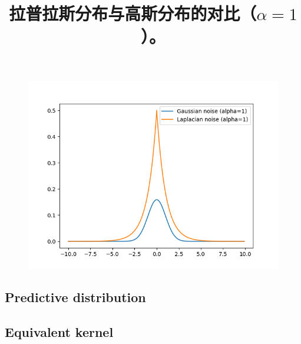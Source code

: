 \documentclass{article}
\begin{document}
	\begin{figure}[!htbp]
	\begin{center}
	\includegraphics[scale=.4]{C4-1.png}	
	\end{center}
	\title{拉普拉斯分布与高斯分布的对比（$\alpha=1$）。}
	\end{figure}
	
	\subsection{Predictive distribution}
	
	\subsection{Equivalent kernel}
\end{document}
